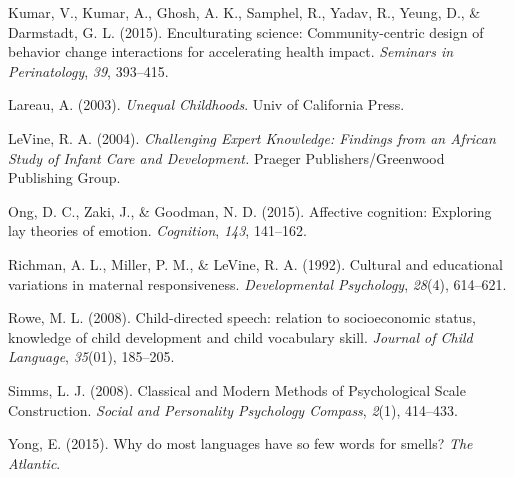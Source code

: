 \documentclass[10pt, letterpaper]{article}
\begin{document}
Kumar, V., Kumar, A., Ghosh, A. K., Samphel, R., Yadav, R., Yeung, D.,
\& Darmstadt, G. L. (2015). Enculturating science: Community-centric
design of behavior change interactions for accelerating health impact.
\emph{Seminars in Perinatology}, \emph{39}, 393--415.

Lareau, A. (2003). \emph{Unequal Childhoods}. Univ of California Press.

LeVine, R. A. (2004). \emph{Challenging Expert Knowledge: Findings from
an African Study of Infant Care and Development.} Praeger
Publishers/Greenwood Publishing Group.

Ong, D. C., Zaki, J., \& Goodman, N. D. (2015). Affective cognition:
Exploring lay theories of emotion. \emph{Cognition}, \emph{143},
141--162.

Richman, A. L., Miller, P. M., \& LeVine, R. A. (1992). Cultural and
educational variations in maternal responsiveness. \emph{Developmental
Psychology}, \emph{28}(4), 614--621.

Rowe, M. L. (2008). Child-directed speech: relation to socioeconomic
status, knowledge of child development and child vocabulary skill.
\emph{Journal of Child Language}, \emph{35}(01), 185--205.

Simms, L. J. (2008). Classical and Modern Methods of Psychological Scale
Construction. \emph{Social and Personality Psychology Compass},
\emph{2}(1), 414--433.

Yong, E. (2015). Why do most languages have so few words for smells?
\emph{The Atlantic}.
\end{document}
